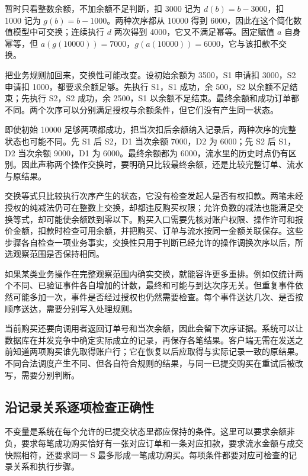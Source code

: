暂时只看整数余额，不加余额不足判断，扣 3000 记为 \(d(b)=b-3000\)，扣 1000 记为 \(g(b)=b-1000\)。两种次序都从 10000 得到 6000，因此在这个简化数值模型中可交换；连续执行 \(d\) 两次得到 4000，它又不满足幂等。固定赋值 \(a\) 自身幂等，但 \(a(g(10000))=7000\)，\(g(a(10000))=6000\)，它与该扣款不交换。



把业务规则加回来，交换性可能改变。设初始余额为 3500，S1 申请扣 3000，S2 申请扣 1000，都要求余额足够。先执行 S1，S1 成功，余 500，S2 以余额不足结束；先执行 S2，S2 成功，余 2500，S1 以余额不足结束。最终余额和成功订单都不同。两个次序可以分别满足授权与余额条件，但它们没有产生同一状态。

即使初始 10000 足够两项都成功，把当次扣后余额纳入记录后，两种次序的完整状态也可能不同。先 S1 后 S2，D1 当次余额 7000，D2 为 6000；先 S2 后 S1，D2 当次余额 9000，D1 为 6000。最终余额都为 6000，流水里的历史时点仍有区别。因此声称两个操作交换时，要明确只比较最终余额，还是比较完整订单、流水与原结果。

交换等式只比较执行次序产生的状态，它没有检查发起人是否有权扣款。两笔未经授权的纯减法仍可在整数上交换，却都违反购买权限；允许负数的减法也能满足交换等式，却可能使余额跌到零以下。购买入口需要先核对账户权限、操作许可和报价金额，扣款时检查可用余额，并把购买、订单与流水按同一金额关联保存。这些步骤各自检查一项业务事实，交换性只用于判断已经允许的操作调换次序以后，所选观察范围是否保持相同。

如果某类业务操作在完整观察范围内确实交换，就能容许更多重排。例如仅统计两个不同、已验证事件各自增加的计数，最终和可能与到达次序无关。但重复事件依然可能多加一次，事件是否经过授权也仍然需要检查。每个事件送达几次、是否按顺序送达，需要分别写入处理规则。

当前购买还要向调用者返回订单号和当次余额，因此会留下次序证据。系统可以让数据库在并发竞争中确定实际成立的记录，再保存各笔结果。客户端无需在发送之前知道两项购买谁先取得账户行；它在恢复以后应取得与实际记录一致的原结果。不同合法调度产生不同、但各自符合规则的结果，与同一已提交购买在重试后被改写，需要分别判断。

\subsection*{沿记录关系逐项检查正确性}

不变量是系统在每个允许的已提交状态里都应保持的条件。这里可以要求余额非负，要求每笔成功购买恰好有一张对应订单和一条对应扣款，要求流水金额与成交快照相符，还要求同一 S 最多形成一笔成功购买。每项条件都要对应可检查的记录关系和执行步骤。

